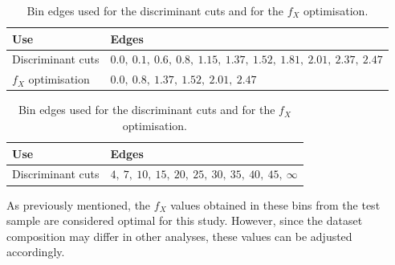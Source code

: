 \begin{table}[htbp]
  \centering
  \caption{Bin edges used for the discriminant cuts and for the $f_X$ optimisation.}
  \footnotesize
  \setlength{\tabcolsep}{5pt}
  \renewcommand{\arraystretch}{1.1}

  \begin{subtable}[t]{\linewidth}
    \centering
    \vspace{2pt}
    \begin{tabular}{@{}ll@{}}
      \toprule
      \textbf{Use} & \textbf{Edges} \\
      \midrule
      Discriminant cuts &
      $0.0,\ 0.1,\ 0.6,\ 0.8,\ 1.15,\ 1.37,\ 1.52,\ 1.81,\ 2.01,\ 2.37,\ 2.47$ \\
      $f_X$ optimisation &
      $0.0,\ 0.8,\ 1.37,\ 1.52,\ 2.01,\ 2.47$ \\
      \bottomrule
    \end{tabular}
  \end{subtable}

  \vspace{0.4cm} %

  \begin{subtable}[t]{\linewidth}
    \centering
    \vspace{2pt}
    \begin{tabular}{@{}ll@{}}
      \toprule
      \textbf{Use} & \textbf{Edges} \\
      \midrule
      Discriminant cuts &
      $4,\ 7,\ 10,\ 15,\ 20,\ 25,\ 30,\ 35,\ 40,\ 45,\ \infty$ \\
      \bottomrule
    \end{tabular}
  \end{subtable}
  \label{tune:binning}
\end{table}

As previously mentioned, the $f_{X}$ values obtained in these bins from the test sample are considered optimal for this study. However, since the dataset composition may differ in other analyses, these values can be adjusted accordingly.

